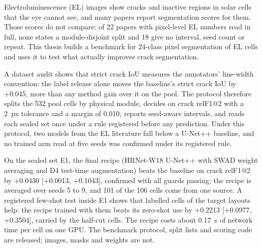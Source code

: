Electroluminescence (EL) images show cracks and inactive regions in solar cells that the eye cannot see, and many papers report
segmentation scores for them. Those scores do not compare: of 22 papers with pixel-level EL numbers read in full, none states a
module-disjoint split and 18 give no interval, seed count or repeat. This thesis builds a benchmark for 24-class pixel segmentation
of EL cells and uses it to test what actually improves crack segmentation.

A dataset audit shows that strict crack IoU measures the annotators' line-width convention: the label release alone moves the
baseline's strict crack IoU by +0.045, more than any method gain over it on the pool. The protocol therefore splits the 532 pool
cells by physical module, decides on crack relF1@2 with a 2~px tolerance and a margin of 0.010, reports seed-aware intervals, and
reads each sealed set once under a rule registered before any prediction. Under this protocol, two models from the EL literature
fall below a U-Net++ baseline, and no trained arm read at five seeds was confirmed under its registered rule.

On the sealed set E1, the final recipe (HRNet-W18 U-Net++ with SWAD weight averaging and D4 test-time augmentation) beats the
baseline on crack relF1@2 by +0.0430 [+0.0013, +0.1043], confirmed with all guards passing; the recipe is averaged over seeds 5 to 9,
and 101 of the 106 cells come from one source. A registered few-shot test inside E1 shows that labelled cells of the target layouts
help: the recipe trained with them beats its zero-shot use by +0.2213 [+0.0977, +0.3504], carried by the half-cut cells. The recipe costs about
0.17~s of network time per cell on one GPU. The benchmark protocol, split lists and scoring code are released; images, masks and
weights are not.
